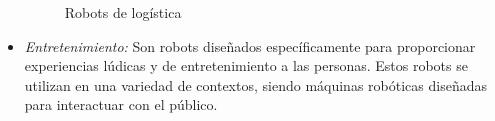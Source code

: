 \begin{itemize}
 
 
 \begin{figure}[H]
    \begin{center}
      \subcapcentertrue
      \hspace{2mm}
    \end{center}
    \caption{Robots de logística}
    \label{fig:Robots de logística}
  \end{figure}
  
 \pagebreak 
 \item \textit{Entretenimiento:} Son robots diseñados específicamente para proporcionar experiencias lúdicas y de entretenimiento a las personas. Estos robots se utilizan en una variedad de contextos, siendo máquinas robóticas diseñadas para interactuar con el público. 
 

\end{itemize}
